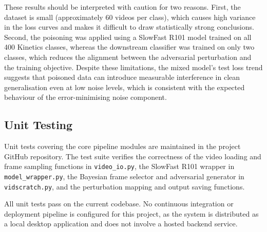 These results should be interpreted with caution for two
reasons. First, the dataset is small (approximately 60
videos per class), which causes high variance in the loss
curves and makes it difficult to draw statistically strong
conclusions. Second, the poisoning was applied using a
SlowFast R101 model trained on all 400 Kinetics classes,
whereas the downstream classifier was trained on only two
classes, which reduces the alignment between the adversarial
perturbation and the training objective. Despite these
limitations, the mixed model's test loss trend suggests
that poisoned data can introduce measurable interference
in clean generalisation even at low noise levels, which
is consistent with the expected behaviour of the
error-minimising noise component.

\subsection{Unit Testing}
\label{subsection:unit-testing}

Unit tests covering the core pipeline modules are
maintained in the project GitHub repository. The test
suite verifies the correctness of the video loading and
frame sampling functions in \texttt{video\_io.py}, the
SlowFast R101 wrapper in \texttt{model\_wrapper.py},
the Bayesian frame selector and adversarial generator
in \texttt{vidscratch.py}, and the perturbation mapping
and output saving functions.

All unit tests pass on the current codebase. No
continuous integration or deployment pipeline is
configured for this project, as the system is
distributed as a local desktop application and does
not involve a hosted backend service.

